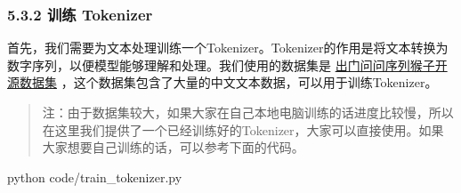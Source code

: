 \documentclass[
]{article}
\newenvironment{Shaded}{}{}
\newcommand{\ExtensionTok}[1]{#1}
\newcommand{\NormalTok}[1]{#1}
\begin{document}
\subsubsection{5.3.2 训练 Tokenizer}\label{ux8badux7ec3-tokenizer-1}

首先，我们需要为文本处理训练一个Tokenizer。Tokenizer的作用是将文本转换为数字序列，以便模型能够理解和处理。我们使用的数据集是
\href{https://www.modelscope.cn/datasets/ddzhu123/seq-monkey/files}{出门问问序列猴子开源数据集}
，这个数据集包含了大量的中文文本数据，可以用于训练Tokenizer。

\begin{quote}
注：由于数据集较大，如果大家在自己本地电脑训练的话进度比较慢，所以在这里我们提供了一个已经训练好的Tokenizer，大家可以直接使用。如果大家想要自己训练的话，可以参考下面的代码。
\end{quote}

\begin{Shaded}
\begin{Highlighting}[]
\ExtensionTok{python}\NormalTok{ code/train\_tokenizer.py}
\end{Highlighting}
\end{Shaded}
\end{document}
